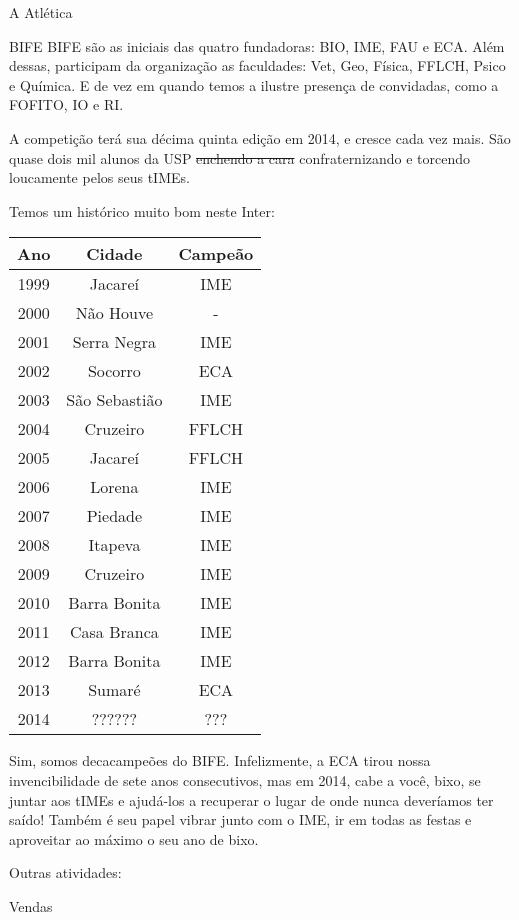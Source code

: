 \begin{secao}{A Atlética}
\begin{subsecao}{BIFE}
BIFE são as iniciais das quatro fundadoras: BIO, IME, FAU e ECA.
Além dessas, participam da organização as faculdades: Vet, Geo, Física, FFLCH,
Psico e Química. E de vez em quando temos a ilustre presença de convidadas, como
a FOFITO, IO e RI.

A competição terá sua décima quinta edição em 2014, e cresce cada vez mais. %
São quase dois mil alunos da USP \sout{enchendo a cara} confraternizando e
torcendo loucamente pelos seus tIMEs.

Temos um histórico muito bom neste Inter:
\begin{center}
	\begin{tabular}{c|c|c}
	  Ano & Cidade & Campeão\\
	  \hline
	  1999 & Jacareí & IME\\
	  2000 & Não Houve & - \\
	  2001 & Serra Negra & IME\\
	  2002 & Socorro & ECA\\
	  2003 & São Sebastião & IME\\
	  2004 & Cruzeiro & FFLCH\\
	  2005 & Jacareí & FFLCH\\
	  2006 & Lorena & IME\\
	  2007 & Piedade & IME\\
	  2008 & Itapeva & IME\\
	  2009 & Cruzeiro & IME\\
	  2010 & Barra Bonita & IME\\
	  2011 & Casa Branca & IME\\
	  2012 & Barra Bonita & IME\\
	  2013 & Sumaré & ECA\\
	  2014 & ?????? & ???
	\end{tabular}
\end{center}

Sim, somos decacampeões do BIFE.
Infelizmente, a ECA tirou nossa invencibilidade de sete anos consecutivos, mas
em 2014, cabe a você, bixo, se juntar aos tIMEs e ajudá-los a recuperar o lugar %
de onde nunca deveríamos ter saído! Também é seu papel vibrar junto com o IME,
ir em todas as festas e aproveitar ao máximo o seu ano de bixo.

\end{subsecao}

Outras atividades:

\begin{subsecao}{Vendas}


\end{subsecao}
\end{secao}

